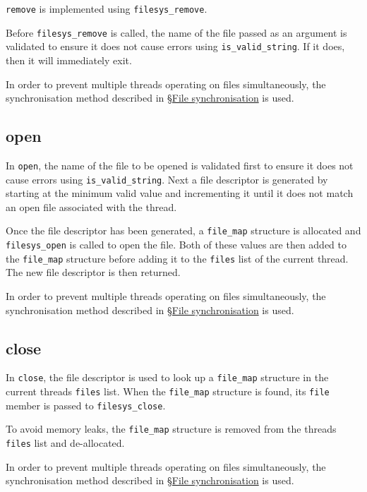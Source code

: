 \documentclass{article}
\begin{document}
\verb!remove! is implemented using \verb!filesys_remove!.

Before \verb!filesys_remove! is called, the name of the file passed as an argument is validated to ensure it does not cause errors using \verb!is_valid_string!. If it does, then it will immediately exit.

In order to prevent multiple threads operating on files simultaneously, the synchronisation method described in \hyperref[sec:file-synchronisation]{\S File synchronisation} is used.

\subsection{open}
\label{sec:open}

In \verb!open!, the name of the file to be opened is validated first to ensure it does not cause errors using \verb!is_valid_string!. Next a file descriptor is generated by starting at the minimum valid value and incrementing it until it does not match an open file associated with the thread.

Once the file descriptor has been generated, a \verb!file_map! structure is allocated and \verb!filesys_open! is called to open the file. Both of these values are then added to the \verb!file_map! structure before adding it to the \verb!files! list of the current thread. The new file descriptor is then returned.

In order to prevent multiple threads operating on files simultaneously, the synchronisation method described in \hyperref[sec:file-synchronisation]{\S File synchronisation} is used.

\subsection{close}
\label{sec:close}

In \verb!close!, the file descriptor is used to look up a \verb!file_map! structure in the current threads \verb!files! list. When the \verb!file_map! structure is found, its \verb!file! member is passed to \verb!filesys_close!.

To avoid memory leaks, the \verb!file_map! structure is removed from the threads \verb!files! list and de-allocated.

In order to prevent multiple threads operating on files simultaneously, the synchronisation method described in \hyperref[sec:file-synchronisation]{\S File synchronisation} is used.
\end{document}

